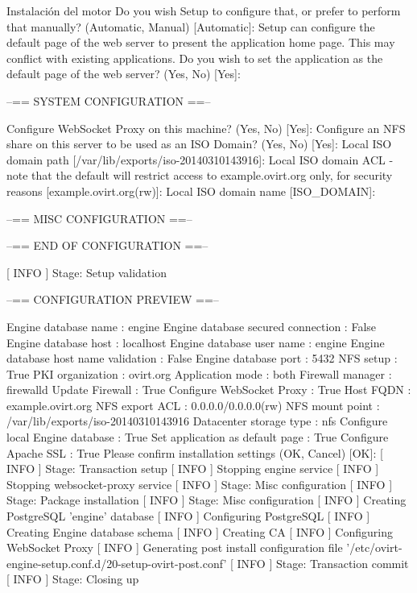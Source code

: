 \begin{TMterminal}{}{}{Instalación del motor}
           Do you wish Setup to configure that, or prefer to perform that manually? (Automatic, Manual) [Automatic]: 
           Setup can configure the default page of the web server to present the application home page. This may conflict with existing applications.
           Do you wish to set the application as the default page of the web server? (Yes, No) [Yes]: 
          
           --== SYSTEM CONFIGURATION ==--
          
           Configure WebSocket Proxy on this machine? (Yes, No) [Yes]: 
           Configure an NFS share on this server to be used as an ISO Domain? (Yes, No) [Yes]: 
           Local ISO domain path [/var/lib/exports/iso-20140310143916]: 
           Local ISO domain ACL - note that the default will restrict access to example.ovirt.org only, for security reasons [example.ovirt.org(rw)]: 
           Local ISO domain name [ISO_DOMAIN]: 
          
           --== MISC CONFIGURATION ==--
     
           --== END OF CONFIGURATION ==--

        [ INFO  ] Stage: Setup validation
          
                    --== CONFIGURATION PREVIEW ==--
          
           Engine database name                    : engine
           Engine database secured connection      : False
           Engine database host                    : localhost
           Engine database user name               : engine
           Engine database host name validation    : False
           Engine database port                    : 5432
           NFS setup                               : True
           PKI organization                        : ovirt.org
           Application mode                        : both
           Firewall manager                        : firewalld
           Update Firewall                         : True
           Configure WebSocket Proxy               : True
           Host FQDN                               : example.ovirt.org
           NFS export ACL                          : 0.0.0.0/0.0.0.0(rw)
           NFS mount point                         : /var/lib/exports/iso-20140310143916
           Datacenter storage type                 : nfs
           Configure local Engine database         : True
           Set application as default page         : True
           Configure Apache SSL                    : True
           Please confirm installation settings (OK, Cancel) [OK]:   
   [ INFO  ] Stage: Transaction setup
   [ INFO  ] Stopping engine service
   [ INFO  ] Stopping websocket-proxy service
   [ INFO  ] Stage: Misc configuration
   [ INFO  ] Stage: Package installation
   [ INFO  ] Stage: Misc configuration
   [ INFO  ] Creating PostgreSQL 'engine' database
   [ INFO  ] Configuring PostgreSQL
   [ INFO  ] Creating Engine database schema
   [ INFO  ] Creating CA
   [ INFO  ] Configuring WebSocket Proxy
   [ INFO  ] Generating post install configuration file '/etc/ovirt-engine-setup.conf.d/20-setup-ovirt-post.conf'
   [ INFO  ] Stage: Transaction commit
   [ INFO  ] Stage: Closing up
          

\end{TMterminal}
